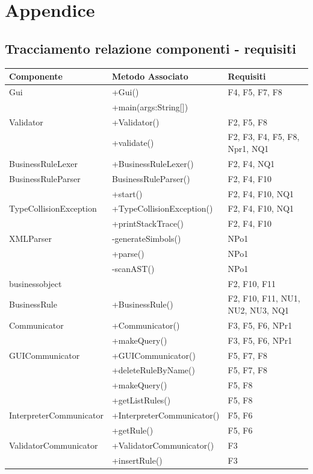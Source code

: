 \documentclass[11pt,titlepage,a4paper]{report}
\begin{document}
\chapter{Appendice}
\section{Tracciamento relazione componenti - requisiti}

\begin{tabular}{||p{4.8cm}||p{5.3cm}||p{3.9cm}||}\hline
\hline
Componente & Metodo Associato & Requisiti \\\hline
Gui & +Gui() & F4, F5, F7, F8 \\\cline{2-3}
& +main(args:String[]) & \bigskip \\\hline

Validator & +Validator() & F2, F5, F8 \\\cline{2-3}
& +validate() & F2, F3, F4, F5, F8, Npr1, NQ1 \\\hline

BusinessRuleLexer & +BusinessRuleLexer() & F2, F4, NQ1 \\\hline

BusinessRuleParser & BusinessRuleParser() & F2, F4, F10 \\\cline{2-3}
& +start() & F2, F4, F10, NQ1 \\\hline

TypeCollisionException & +TypeCollisionException() & F2, F4, F10, NQ1 \\\cline{2-3}
& +printStackTrace() & F2, F4, F10 \\\hline

XMLParser & -generateSimbols() & NPo1 \\\cline{2-3}
& +parse() & NPo1 \\\cline{2-3}
& -scanAST() & NPo1 \\\hline

businessobject & \bigskip & F2, F10, F11 \\\hline

BusinessRule & +BusinessRule() & F2, F10, F11, NU1, NU2, NU3, NQ1 \\\hline

Communicator & +Communicator() & F3, F5, F6, NPr1 \\\cline{2-3}
& +makeQuery() & F3, F5, F6, NPr1 \\\hline

GUICommunicator & +GUICommunicator() & F5, F7, F8 \\\cline{2-3}
& +deleteRuleByName() & F5, F7, F8 \\\cline{2-3}
& +makeQuery() & F5, F8 \\\cline{2-3}
& +getListRules() & F5, F8 \\\hline

InterpreterCommunicator & +InterpreterCommunicator() & F5, F6 \\\cline{2-3}
& +getRule() & F5, F6 \\\hline

ValidatorCommunicator & +ValidatorCommunicator() & F3 \\\cline{2-3}
& +insertRule() & F3 \\\hline
\end{tabular}

\newpage
\end{document}
